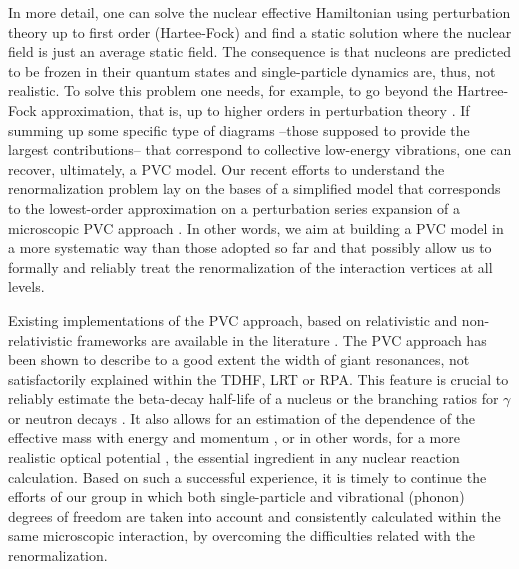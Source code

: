 \documentclass[12pt,a4paper,final]{iopart}
\newcommand{\red}[1]{\textcolor[rgb]{1.0,0.0,0.0}{#1}}
\begin{document}
In more detail, one can solve the nuclear effective Hamiltonian using perturbation theory up to first order (Hartee-Fock) and find a static solution where the nuclear field is just an average static field. The consequence is that nucleons are predicted to be frozen in their quantum states and single-particle dynamics are, thus, not realistic. To solve this problem one needs, for example, to go beyond the Hartree-Fock approximation, that is, up to higher orders in perturbation theory \cite{baldo2015}. If summing up some specific type of diagrams --those supposed to provide the largest contributions-- that correspond to collective low-energy vibrations, one can recover, ultimately, a PVC model.
Our recent efforts to understand the renormalization problem lay on the bases of a simplified model that corresponds to the lowest-order approximation on a perturbation series expansion of a microscopic PVC approach \cite{moghrabi2010, moghrabi2012, brenna2014, yang2016}. In other words, we aim at building a PVC model in a more systematic way than those adopted so far and that possibly allow us to formally and reliably treat the renormalization of the interaction vertices at all levels. 

Existing implementations of the PVC approach, based on relativistic and non-relativistic frameworks are available in the literature \cite{colo2010,bertsch1983,baldo2015,niu2012, mizuyama2012a,litvinova2013,niu2014,niu2016,lyutorovich2015}. The PVC approach has been shown to describe to a good extent the width of giant resonances, not satisfactorily explained within the TDHF, LRT or RPA. This feature is crucial to reliably estimate the beta-decay half-life of a nucleus \cite{yifei2015} or the branching ratios for $\gamma$ \cite{brenna2012} or neutron decays \cite{colo1994}. It also allows for an estimation of the dependence of the effective mass with energy and momentum \cite{mahaux1985}, or in other words, for a more realistic optical potential \cite{mizuyama2012,blanchon2015}, the essential ingredient in any nuclear reaction calculation. Based on such a successful experience, it is timely to continue the efforts of our group in which both single-particle and vibrational (phonon) degrees of freedom are taken into account and consistently calculated within the same microscopic interaction, by overcoming the difficulties related with the renormalization. 
\end{document}
